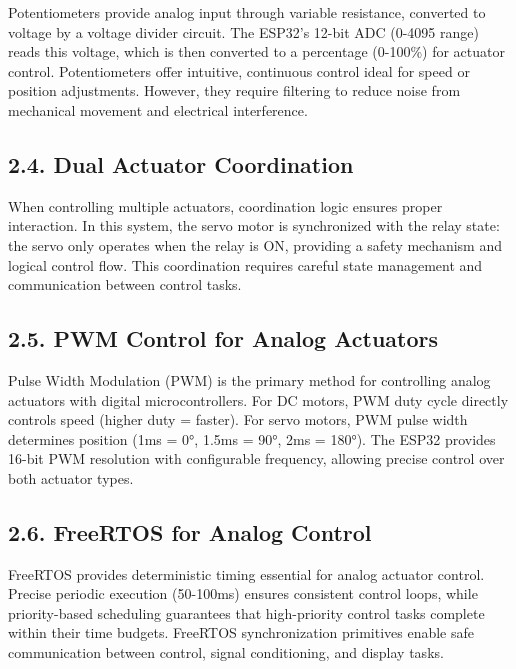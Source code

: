 \documentclass[12pt]{article}
\begin{document}
Potentiometers provide analog input through variable resistance, converted to voltage by a voltage divider circuit. The ESP32's 12-bit ADC (0-4095 range) reads this voltage, which is then converted to a percentage (0-100\%) for actuator control. Potentiometers offer intuitive, continuous control ideal for speed or position adjustments. However, they require filtering to reduce noise from mechanical movement and electrical interference.

\subsection*{2.4. Dual Actuator Coordination}

When controlling multiple actuators, coordination logic ensures proper interaction. In this system, the servo motor is synchronized with the relay state: the servo only operates when the relay is ON, providing a safety mechanism and logical control flow. This coordination requires careful state management and communication between control tasks.

\subsection*{2.5. PWM Control for Analog Actuators}

Pulse Width Modulation (PWM) is the primary method for controlling analog actuators with digital microcontrollers. For DC motors, PWM duty cycle directly controls speed (higher duty = faster). For servo motors, PWM pulse width determines position (1ms = 0°, 1.5ms = 90°, 2ms = 180°). The ESP32 provides 16-bit PWM resolution with configurable frequency, allowing precise control over both actuator types.

\subsection*{2.6. FreeRTOS for Analog Control}

FreeRTOS provides deterministic timing essential for analog actuator control. Precise periodic execution (50-100ms) ensures consistent control loops, while priority-based scheduling guarantees that high-priority control tasks complete within their time budgets. FreeRTOS synchronization primitives enable safe communication between control, signal conditioning, and display tasks.

\end{document}

